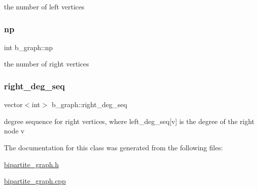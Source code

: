 the number of left vertices 

\mbox{\label{classb__graph_acffdd5f20329515eb6ec17ad24f1ca64}} 
\subsubsection{\texorpdfstring{np}{np}}
{\footnotesize\ttfamily int b\+\_\+graph\+::np\hspace{0.3cm}{\ttfamily [private]}}



the number of right vertices 

\mbox{\label{classb__graph_ae4c875ed6a583a78f38dfe958f20fad5}} 
\subsubsection{\texorpdfstring{right\+\_\+deg\+\_\+seq}{right\_deg\_seq}}
{\footnotesize\ttfamily vector$<$int$>$ b\+\_\+graph\+::right\+\_\+deg\+\_\+seq\hspace{0.3cm}{\ttfamily [private]}}



degree sequence for right vertices, where left\+\_\+deg\+\_\+seq\mbox{[}v\mbox{]} is the degree of the right node v 



The documentation for this class was generated from the following files\+:\begin{DoxyCompactItemize}
\item 
\hyperlink{bipartite__graph_8h}{bipartite\+\_\+graph.\+h}\item 
\hyperlink{bipartite__graph_8cpp}{bipartite\+\_\+graph.\+cpp}\end{DoxyCompactItemize}
